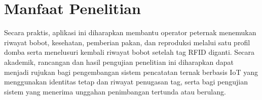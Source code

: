 \section{Manfaat Penelitian}

Secara praktis, aplikasi ini diharapkan membantu {\setlength{\fboxsep}{1pt}\colorbox{revisilama}{operator}} {\setlength{\fboxsep}{1pt}\colorbox{revisibaru}{peternak}} menemukan riwayat
bobot, kesehatan, pemberian pakan, dan reproduksi melalui satu profil domba
serta menelusuri kembali riwayat bobot setelah tag RFID diganti. Secara
akademik, rancangan dan hasil pengujian penelitian ini diharapkan dapat
menjadi rujukan bagi pengembangan sistem pencatatan ternak berbasis IoT yang
menggunakan identitas tetap dan riwayat penugasan tag, serta bagi pengujian
sistem yang menerima unggahan penimbangan tertunda atau berulang.
